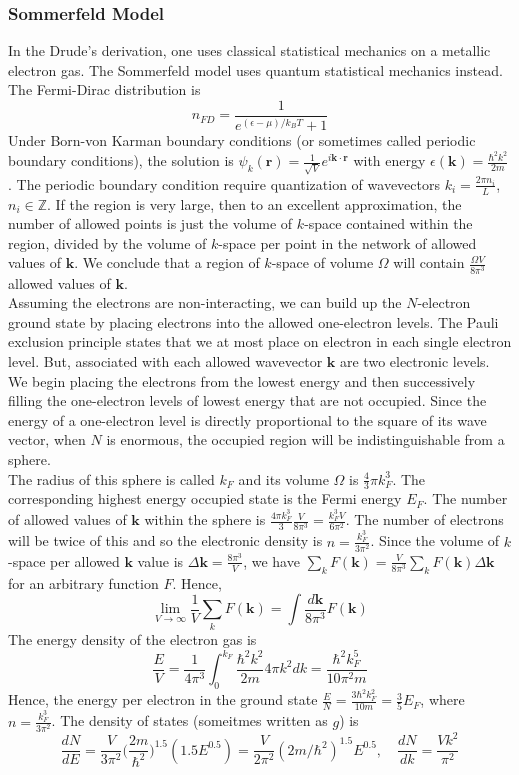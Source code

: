 \documentclass[a4paper]{article}
\begin{document}
\subsubsection*{Sommerfeld Model}
\begin{Note}
In the Drude's derivation, one uses classical statistical mechanics on a metallic electron gas. The Sommerfeld model uses quantum statistical mechanics instead. The Fermi-Dirac distribution is
$$n_{FD}=\frac{1}{e^{(\epsilon-\mu)/k_BT}+1}$$
Under Born-von Karman boundary conditions (or sometimes called periodic boundary conditions), the solution is $\psi_k(\mathbf{r})=\frac{1}{\sqrt{V}}e^{i\mathbf{k}\cdot\mathbf{r}}$ with energy $\epsilon(\mathbf{k})=\frac{\hbar^2k^2}{2m}$. The periodic boundary condition require quantization of wavevectors $k_i=\frac{2\pi n_i}{L}$, $n_i\in\mathbb{Z}$. If the region is very large, then to an excellent approximation, the number of allowed points is just the volume of $k$-space contained within the region, divided by the volume of $k$-space per point in the network of allowed values of $\mathbf{k}$. We conclude that a region of $k$-space of volume $\Omega$ will contain $\frac{\Omega V}{8\pi^3}$ allowed values of $\mathbf{k}$.\\[5pt]
Assuming the electrons are non-interacting, we can build up the $N$-electron ground state by placing electrons into the allowed one-electron levels. The Pauli exclusion principle states that we at most place on electron in each single electron level. But, associated with each allowed wavevector $\mathbf{k}$ are two electronic levels.\\[5pt]
We begin placing the electrons from the lowest energy and then successively filling the one-electron levels of lowest energy that are not occupied. Since the energy of a one-electron level is directly proportional to the square of its wave vector, when $N$ is enormous, the occupied region will be indistinguishable from a sphere.\\[5pt]
The radius of this sphere is called $k_F$ and its volume $\Omega$ is $\frac{4}{3}\pi k_F^3$. The corresponding highest energy occupied state is the Fermi energy $E_F$. The number of allowed values of $\mathbf{k}$ within the sphere is $\frac{4\pi k_F^3}{3}\frac{V}{8\pi^3}=\frac{k_F^3V}{6\pi^2}$. The number of electrons will be twice of this and so the electronic density is $n=\frac{k_F^3}{3\pi^2}$. Since the volume of $k$-space per allowed $\mathbf{k}$ value is $\Delta\mathbf{k}=\frac{8\pi^3}{V}$, we have $\sum_kF(\mathbf{k})=\frac{V}{8\pi^3}\sum_kF(\mathbf{k})\Delta\mathbf{k}$ for an arbitrary function $F$. Hence,
$$\lim_{V\rightarrow\infty}\frac{1}{V}\sum_kF(\mathbf{k})=\int\frac{d\mathbf{k}}{8\pi^3}F(\mathbf{k})$$
The energy density of the electron gas is
$$\frac{E}{V}=\frac{1}{4\pi^3}\int_0^{k_F}\frac{\hbar^2k^2}{2m}4\pi k^2dk=\frac{\hbar^2k_F^5}{10\pi^2 m}$$
Hence, the energy per electron in the ground state $\frac{E}{N}=\frac{3\hbar^2k_F^2}{10m}=\frac{3}{5}E_F$, where $n=\frac{k_F^3}{3\pi^2}$. The density of states (someitmes written as $g$) is
$$\frac{dN}{dE}=\frac{V}{3\pi^2}\bigg(\frac{2m}{\hbar^2}\bigg)^{1.5}(1.5E^{0.5})=\frac{V}{2\pi^2}(2m/\hbar^2)^{1.5}E^{0.5},\quad \frac{dN}{dk}=\frac{Vk^2}{\pi^2}$$
\end{Note}
\end{document}
